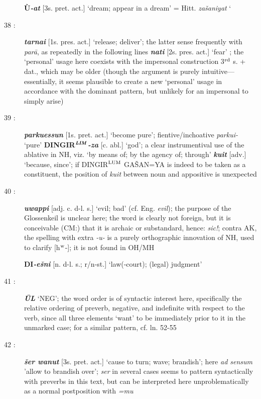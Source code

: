 \documentclass[10pt]{article}
\newcommand{\supersc}[1]{$^{\textrm{\scriptsize{#1}}}$}  	%
\newcommand{\bit}[1]{\textbf{\textit{#1}}}				%
\newcommand{\p}[1]{{\tiny[{#1}]}}					%
\newcommand{\hith}{\textsubwedge{h}}
\renewcommand{\.}[1]{\textsubdot{#1}}
\begin{document}
\begin{description}
\textbf{\`U}\bit{-at} \p{3s. pret. act.} `dream; appear in a dream' = Hitt. \textit{za\v{s}{\hith}aniyat}
`
\item[38 :] \bit{tarna{\hith\hith}i} \p{1s. pres. act.} `release; deliver'; the latter sense frequently with \textit{par\=a}, as repeatedly in the following lines \bit{na{\hith}ti} \p{2s. pres. act.} `fear' ; the `personal' usage here coexists with the impersonal construction 3\supersc{rd} s. + dat., which may be older (though the argument is purely intuitive---essentially, it seems plausible to create a new `personal' usage in accordance with the dominant pattern, but unlikely for an impersonal to simply arise)

\item[39 :] \bit{parkuessun} \p{1s. pret. act.} `become pure'; fientive/inchoative \textit{parkui-} `pure' \textbf{DINGIR}\supersc{\bit{LIM}}\bit{-za} \p{c. abl.} `god'; a clear instrumentival use of the ablative in NH, viz. `by means of; by the agency of; through' \bit{kuit} \p{adv.} `because, since'; if DINGIR\supersc{LUM} GA\v{S}AN=YA is indeed to be taken as a constituent, the position of \textit{kuit} between noun and appositive is unexpected

\item[40 :] \bit{{\hith}uwappi} \p{adj. c. d-l. s.} `evil; bad' (cf. Eng. \textit{evil}); the purpose of the Glossenkeil is unclear here; the word is clearly not foreign, but it is conceivable (CM:) that it is archaic or substandard, hence: \textit{sic!}; contra AK, the spelling with extra \textit{-u-} is a purely orthographic innovation of NH, used to clarify [h\supersc{w}-]; it is not found in OH/MH 

\textbf{DI}\bit{-e\v{s}ni} \p{n. d-l. s.; r/n-st.} `law(-court); (legal) judgment'

\item[41 :] \bit{\=UL} `NEG'; the word order is of syntactic interest here, specifically the relative ordering of preverb, negative, and indefinite with respect to the verb, since all three elements `want' to be immediately prior to it in the unmarked case; for a similar pattern, cf. ln. 52-55

\item[42 :] \bit{\v{s}er wa{\hith}nut} \p{3s. pret. act.} `cause to turn; wave; brandish'; here \textit{ad sensum} 'allow to brandish over'; \textit{ser} in several cases seems to pattern syntactically with preverbs in this text, but can be interpreted here unproblematically as a normal postposition with \textit{=mu}


\end{description}
\end{document}
